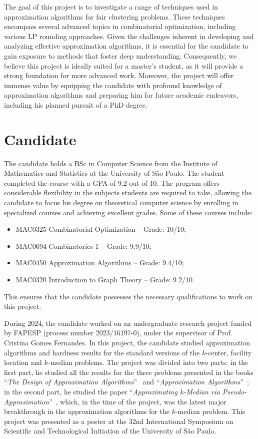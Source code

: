 \documentclass[12pt]{article}
\begin{document}
The goal of this project is to investigate a range of techniques used in approximation algorithms for fair clustering problems. 
These techniques encompass several advanced topics in combinatorial optimization, including various LP rounding approaches. 
Given the challenges inherent in developing and analyzing effective approximation algorithms, it is essential for the candidate to gain exposure to methods that foster deep understanding. 
Consequently, we believe this project is ideally suited for a master's student, as it will provide a strong foundation for more advanced work. 
Moreover, the project will offer immense value by equipping the candidate with profound knowledge of approximation algorithms and preparing him for future academic endeavors, including his planned pursuit of a PhD degree.

\section{Candidate}
The candidate holds a BSc in Computer Science from the Institute of Mathematics and Statistics at the University of São Paulo.
The student completed the course with a GPA of 9.2 out of 10. The program offers considerable flexibility in the subjects students are required to take, allowing the candidate to focus his degree on theoretical computer science by enrolling in specialized courses and achieving excellent grades. Some of these courses include:
\begin{itemize} 
    \item MAC0325 Combinatorial Optimization – Grade: 10/10; 
    \item MAC0694 Combinatorics 1 – Grade: 9.9/10; 
    \item MAC0450 Approximation Algorithms – Grade: 9.4/10; 
    \item MAC0320 Introduction to Graph Theory – Grade: 9.2/10. 
\end{itemize}
This ensures that the candidate possesses the necessary qualifications to work on this project.

During 2024, the candidate worked on an undergraduate research project funded by FAPESP (process number 2023/16197-0), under the supervisor of Prof. Cristina Gomes Fernandes.
In this project, the candidate studied approximation algorithms and hardness results for the standard versions of the $k$-center, facility location and $k$-median problems. 
The project was divided into two parts: in the first part, he studied all the results for the three problems presented in the books  ``\emph{The Design of Approximation Algorithms}''~\cite{books/WS} and ``\emph{Approximation Algorithms}''~\cite{books/Vazirani}; in the second part, he studied the paper ``\emph{Approximating $k$-Median via Pseudo-Approximation}''~\cite{LS2012}, which, in the time of the project, was the latest major breakthrough in the approximation algorithms for the $k$-median problem. 
This project was presented as a poster at the 32nd International Symposium on Scientific and Technological Initiation of the University of São Paulo.
\end{document}
